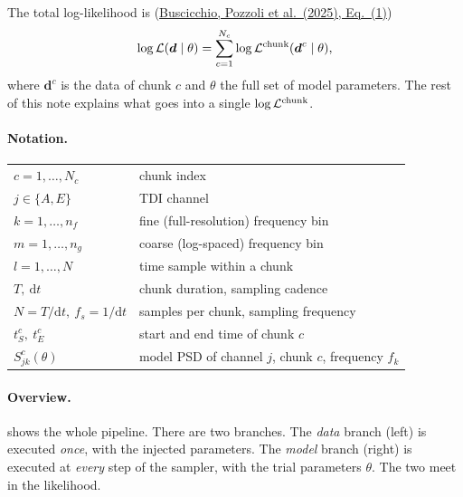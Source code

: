 \documentclass[11pt,a4paper]{article}
\newcommand{\urlPone}{https://arxiv.org/pdf/2511.03604}
\newcommand{\PoneEq}[1]{\href{\urlPone}{Buscicchio, Pozzoli et al.~(2025), Eq.~(#1)}}
\newcommand{\dd}{\mathrm{d}}
\begin{document}
The total log-likelihood is (\PoneEq{1})
\begin{equation}
  \log\mathcal{L}(\boldsymbol{d}\mid\theta)
  = \sum_{c=1}^{N_c} \log\mathcal{L}^{\rm chunk}(\boldsymbol{d}^c\mid\theta),
  \label{eq:total}
\end{equation}
where $\boldsymbol{d}^c$ is the data of chunk $c$ and $\theta$ the full set of model
parameters. The rest of this note explains what goes into a single
$\log\mathcal{L}^{\rm chunk}$.

\paragraph{Notation.}
\begin{center}
\begin{tabular}{@{}ll@{}}
\toprule
$c = 1,\dots,N_c$ & chunk index \\
$j\in\{A,E\}$ & TDI channel \\
$k = 1,\dots,n_f$ & fine (full-resolution) frequency bin \\
$m = 1,\dots,n_g$ & coarse (log-spaced) frequency bin \\
$l = 1,\dots,N$ & time sample within a chunk \\
$T,\ \dd t$ & chunk duration, sampling cadence \\
$N = T/\dd t,\ f_s = 1/\dd t$ & samples per chunk, sampling frequency \\
$t^c_S,\ t^c_E$ & start and end time of chunk $c$ \\
$S^c_{jk}(\theta)$ & model PSD of channel $j$, chunk $c$, frequency $f_k$ \\
\bottomrule
\end{tabular}
\end{center}

\paragraph{Overview.}  shows the whole pipeline. There are two
branches. The \emph{data} branch (left) is executed \emph{once}, with the injected
parameters. The \emph{model} branch (right) is executed at \emph{every} step of the
sampler, with the trial parameters $\theta$. The two meet in the likelihood.
\end{document}
